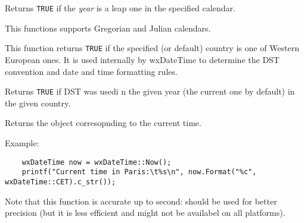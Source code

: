 

\label{wxdatetimeisleapyear}


Returns {\tt TRUE} if the {\it year} is a leap one in the specified calendar.

This functions supports Gregorian and Julian calendars.

\label{wxdatetimeiswesteuropeancountry}


This function returns {\tt TRUE} if the specified (or default) country is one
of Western European ones. It is used internally by wxDateTime to determine the
DST convention and date and time formatting rules.

\label{wxdatetimeisdstapplicable}


Returns {\tt TRUE} if DST was usedi n the given year (the current one by
default) in the given country.

\label{wxdatetimenow}


Returns the object corresopnding to the current time.

Example:

\begin{verbatim}
    wxDateTime now = wxDateTime::Now();
    printf("Current time in Paris:\t%s\n", now.Format("%c", wxDateTime::CET).c_str());
\end{verbatim}

Note that this function is accurate up to second: 
 should be used for better precision
(but it is less efficient and might not be availabel on all platforms).



\label{wxdatetimesetcountry}

